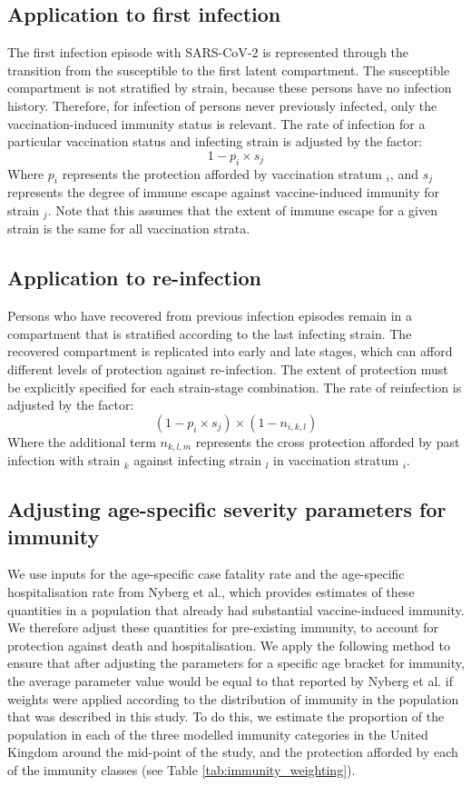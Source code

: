 \subsection{Application to first infection}
The first infection episode with SARS-CoV-2 is represented through the transition from the susceptible
to the first latent compartment.
The susceptible compartment is not stratified by strain,
because these persons have no infection history.
Therefore, for infection of persons never previously infected,
only the vaccination-induced immunity status is relevant.
The rate of infection for a particular vaccination status and infecting strain is adjusted by the factor:
\[1 - p_{i} \times s_{j}\]
Where \(p_{i}\) represents the protection afforded by vaccination stratum \(_{i}\),
and \(s_{j}\) represents the degree of immune escape against vaccine-induced immunity for strain \(_{j}\).
Note that this assumes that the extent of immune escape for a given strain is the same
for all vaccination strata. 

\subsection{Application to re-infection}
Persons who have recovered from previous infection episodes remain in a compartment that is stratified
according to the last infecting strain.
The recovered compartment is replicated into early and late stages,
which can afford different levels of protection against re-infection.
The extent of protection must be explicitly specified for each strain-stage combination.
The rate of reinfection is adjusted by the factor:
\[(1 - p_{i} \times s_{j})\times (1 - n_{i,k,l})\]
Where the additional term \(n_{k,l,m}\) represents the cross protection
afforded by past infection with strain \(_{k}\)
against infecting strain \(_{l}\)
in vaccination stratum \(_{i}\).

\subsection{Adjusting age-specific severity parameters for immunity}
We use inputs for the age-specific case fatality rate and the age-specific hospitalisation rate from Nyberg et al., 
which provides estimates of these quantities in a population that already had substantial vaccine-induced immunity.
We therefore adjust these quantities for pre-existing immunity, to account for protection against death and hospitalisation.
We apply the following method to ensure that after adjusting the parameters for a specific age bracket for immunity,
the average parameter value would be equal to that reported by Nyberg et al. if weights were applied according to the
distribution of immunity in the population that was described in this study.
To do this, we estimate the proportion of the population in each of the three modelled immunity categories
in the United Kingdom around the mid-point of the study,
and the protection afforded by each of the immunity classes (see Table \ref{tab:immunity_weighting}).

